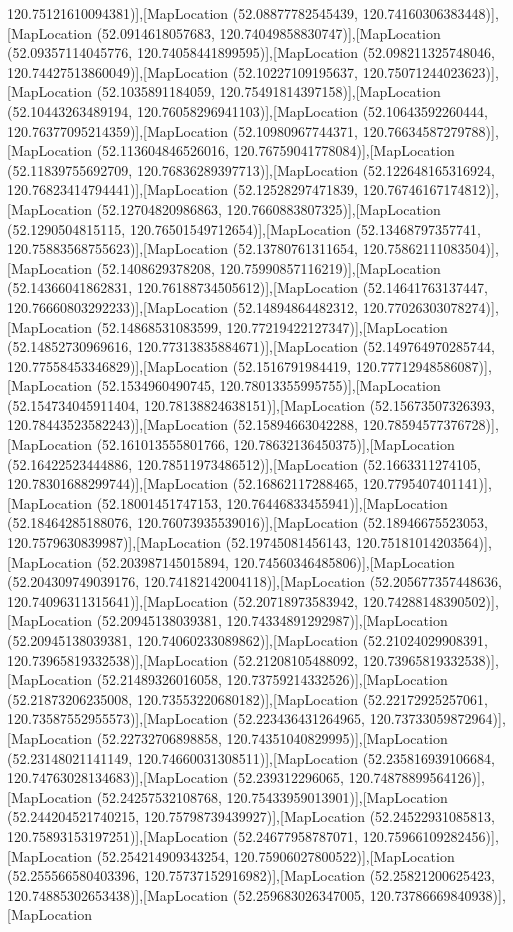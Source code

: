 120.75121610094381)],[MapLocation (52.08877782545439, 120.74160306383448)],[MapLocation (52.0914618057683, 120.74049858830747)],[MapLocation (52.09357114045776, 120.74058441899595)],[MapLocation (52.098211325748046, 120.74427513860049)],[MapLocation (52.10227109195637, 120.75071244023623)],[MapLocation (52.1035891184059, 120.75491814397158)],[MapLocation (52.10443263489194, 120.76058296941103)],[MapLocation (52.10643592260444, 120.76377095214359)],[MapLocation (52.10980967744371, 120.76634587279788)],[MapLocation (52.113604846526016, 120.76759041778084)],[MapLocation (52.11839755692709, 120.76836289397713)],[MapLocation (52.122648165316924, 120.76823414794441)],[MapLocation (52.12528297471839, 120.76746167174812)],[MapLocation (52.12704820986863, 120.7660883807325)],[MapLocation (52.1290504815115, 120.76501549712654)],[MapLocation (52.13468797357741, 120.75883568755623)],[MapLocation (52.13780761311654, 120.75862111083504)],[MapLocation (52.1408629378208, 120.75990857116219)],[MapLocation (52.14366041862831, 120.76188734505612)],[MapLocation (52.14641763137447, 120.76660803292233)],[MapLocation (52.14894864482312, 120.77026303078274)],[MapLocation (52.14868531083599, 120.77219422127347)],[MapLocation (52.14852730969616, 120.77313835884671)],[MapLocation (52.149764970285744, 120.77558453346829)],[MapLocation (52.1516791984419, 120.77712948586087)],[MapLocation (52.1534960490745, 120.78013355995755)],[MapLocation (52.154734045911404, 120.78138824638151)],[MapLocation (52.15673507326393, 120.78443523582243)],[MapLocation (52.15894663042288, 120.78594577376728)],[MapLocation (52.161013555801766, 120.78632136450375)],[MapLocation (52.16422523444886, 120.78511973486512)],[MapLocation (52.1663311274105, 120.78301688299744)],[MapLocation (52.16862117288465, 120.7795407401141)],[MapLocation (52.18001451747153, 120.76446833455941)],[MapLocation (52.18464285188076, 120.76073935539016)],[MapLocation (52.18946675523053, 120.7579630839987)],[MapLocation (52.19745081456143, 120.75181014203564)],[MapLocation (52.203987145015894, 120.74560346485806)],[MapLocation (52.204309749039176, 120.74182142004118)],[MapLocation (52.205677357448636, 120.74096311315641)],[MapLocation (52.20718973583942, 120.74288148390502)],[MapLocation (52.20945138039381, 120.74334891292987)],[MapLocation (52.20945138039381, 120.74060233089862)],[MapLocation (52.21024029908391, 120.73965819332538)],[MapLocation (52.21208105488092, 120.73965819332538)],[MapLocation (52.21489326016058, 120.73759214332526)],[MapLocation (52.21873206235008, 120.73553220680182)],[MapLocation (52.22172925257061, 120.73587552955573)],[MapLocation (52.223436431264965, 120.73733059872964)],[MapLocation (52.22732706898858, 120.74351040829995)],[MapLocation (52.23148021141149, 120.74660031308511)],[MapLocation (52.235816939106684, 120.74763028134683)],[MapLocation (52.239312296065, 120.74878899564126)],[MapLocation (52.24257532108768, 120.75433959013901)],[MapLocation (52.244204521740215, 120.75798739439927)],[MapLocation (52.24522931085813, 120.75893153197251)],[MapLocation (52.24677958787071, 120.75966109282456)],[MapLocation (52.254214909343254, 120.75906027800522)],[MapLocation (52.255566580403396, 120.75737152916982)],[MapLocation (52.25821200625423, 120.74885302653438)],[MapLocation (52.259683026347005, 120.73786669840938)],[MapLocation 